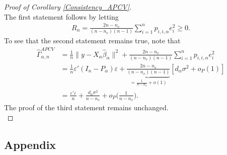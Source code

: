 \documentclass[Research_Module_ES.tex]{subfiles}
\begin{document}
\begin{proof}[Proof of Corollary \ref{Consistency_APCV}]~\\
	The first statement follows by letting 
	\begin{align*}
	R_n= \frac{2n-n_v}{(n-n_v)(n-1)}\sum_{i=1}^np_{i,i,\alpha}e_i^2\ge 0.
	\end{align*}
	To see that the second statement remains true, note that
	\begin{align*}
	\hat{\Gamma}_{\alpha,n}^{APCV} &= \frac{1}{n}\lVert y-X_\alpha\hat{\beta}_\alpha\rVert^2 +\frac{2n-n_v}{(n-n_v)(n-1)}\sum_{i=1}^np_{i,i,\alpha}e_i^2\\
	&=\frac{1}{n} \varepsilon'(I_n-P_\alpha)\varepsilon+ \underbrace{\frac{2n-n_v}{(n-n_v)(n-1)}}_{=\frac{1}{n-n_v}+o(1)}[d_\alpha\sigma^2+o_P(1)]\\
	&=\frac{\varepsilon'\varepsilon}{n} + \frac{d_\alpha\sigma^2}{n-n_v}+o_P\biggl(\frac{1}{n-n_v}\biggr).
	\end{align*}
	The proof of the third statement remains unchanged. \\
\end{proof}

\subsection*{Appendix }



\begin{lstlisting}[title={Algorithmus:~$m+1=6$ und $n=200$}]

\end{lstlisting}

\end{document}
